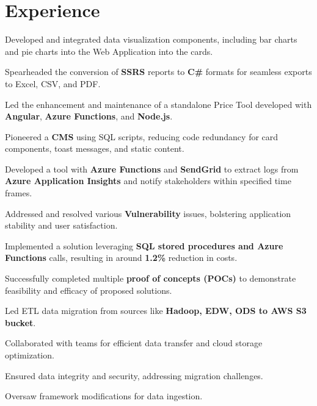 \documentclass[]{deedy-resume-openfont}
\begin{document}
\begin{minipage}[t]{0.66\textwidth}
\section{Experience}
\sectionsep
{}
\vspace{\topsep} %
\begin{tightemize}
\item Developed and integrated data visualization components, including bar charts and pie charts into the Web Application into the cards.
\item Spearheaded the conversion of \textbf{SSRS} reports to\textbf{ C\# }formats for seamless exports to Excel, CSV, and PDF.
\item Led the enhancement and maintenance of a standalone Price Tool developed with \textbf{Angular}, \textbf{Azure Functions}, and \textbf{Node.js}.
\item Pioneered a \textbf{CMS} using SQL scripts, reducing code redundancy for card components, toast messages, and static content.
\item Developed a tool with \textbf{Azure Functions} and \textbf{SendGrid} to extract logs from \textbf{Azure Application Insights} and notify stakeholders within specified time frames.
\item Addressed and resolved various \textbf{Vulnerability} issues, bolstering application stability and user satisfaction.
\item Implemented a solution leveraging \textbf{SQL stored procedures and Azure Functions} calls, resulting in around \textbf{1.2\%} reduction in costs.
\item Successfully completed multiple \textbf{proof of concepts (POCs)} to demonstrate feasibility and efficacy of proposed solutions.
\end{tightemize}
\begin{tightemize}
\item Led ETL data migration from sources like \textbf{Hadoop, EDW, ODS to AWS S3 bucket}.
\item Collaborated with teams for efficient data transfer and cloud storage optimization.
\item Ensured data integrity and security, addressing migration challenges.
\item Oversaw framework modifications for data ingestion.
\end{tightemize}
\sectionsep


\end{minipage}
\end{document}
